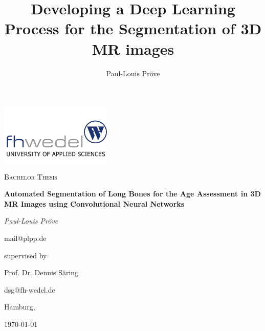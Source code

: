 \documentclass[11pt, a4paper]{article}
\title{Developing a Deep Learning Process for the Segmentation of 3D MR images}
\author{Paul-Louis Pröve}
\begin{document}
    \begin{titlepage}
    \centering
    \includegraphics[width=0.4\textwidth]{imgs/fhw.png}\par
    \vspace{1cm}
    {\scshape\Large Bachelor Thesis\par}
    \vspace{2cm}
    {\bfseries\Huge Automated Segmentation of Long Bones for the Age Assessment in 3D MR Images using Convolutional Neural Networks\par}
    \vspace{2cm}
    {\itshape\Large Paul-Louis Pröve\par}
    mail@plpp.de\par
    \vfill
    supervised by\par
    Prof. Dr. Dennis Säring\par
    dsg@fh-wedel.de\par
    \vspace{1cm}
    Hamburg,\par \today\par
    \end{titlepage}



\tableofcontents
\newpage

\listoffigures
\newpage











\end{document}
